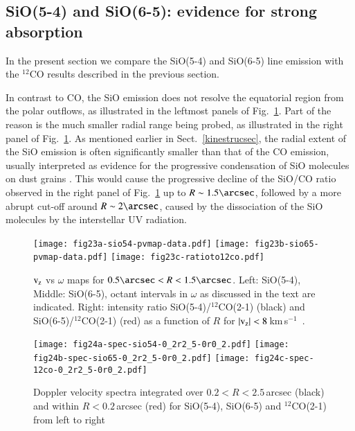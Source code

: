 \documentclass{aa}
\newcommand{\kms}{\,km\,s$^{-1}$~}
\begin{document}
\subsection{SiO(5-4) and SiO(6-5): evidence for strong absorption}
\label{siokinesec}

In the present section we compare the SiO(5-4) and SiO(6-5) line
emission with the $^{12}$CO results described in the previous section.
      
In contrast to CO, the SiO emission does not resolve the equatorial
region from the polar outflows, as illustrated in the leftmost panels
of Fig.~\ref{SiOwavefig}.  Part of the reason is the much smaller
radial range being probed, as illustrated in the right panel of
Fig.~\ref{SiOwavefig}. As mentioned earlier in
Sect.~\ref{kinestrucsec}, the radial extent of the SiO emission is
often significantly smaller than that of the CO emission, usually
interpreted as evidence for the progressive condensation of SiO
molecules on dust grains \citep[e.g.,][]{sowlk2004}. This would cause
the progressive decline of the SiO/CO ratio observed in the right
panel of Fig.~\ref{SiOwavefig}  up to $R\sim1.5\arcsec$, followed by a
more abrupt cut-off around $R\sim2\arcsec$, caused by the dissociation
of the SiO molecules by the interstellar UV radiation.
         
\begin{figure*}
  \centering
  \texttt{[image: fig23a-sio54-pvmap-data.pdf]}
  \texttt{[image: fig23b-sio65-pvmap-data.pdf]}
  \texttt{[image: fig23c-ratioto12co.pdf]}  
  \caption{${\rm v_z}$ vs $\omega$ maps for
    $0.5\arcsec<R<1.5\arcsec$. Left: SiO(5-4), Middle: SiO(6-5),
    octant intervals in $\omega$ as discussed in the text are indicated.
    Right: intensity ratio SiO(5-4)/$^{12}$CO(2-1) (black) and
    SiO(6-5)/$^{12}$CO(2-1) (red) as a function of $R$ for $|{\rm v_z}| <
    8$\kms.}
  \label{SiOwavefig}
\end{figure*}

\begin{figure*}
  \centering
  \texttt{[image: fig24a-spec-sio54-0\_2r2\_5-0r0\_2.pdf]}
  \texttt{[image: fig24b-spec-sio65-0\_2r2\_5-0r0\_2.pdf]}
  \texttt{[image: fig24c-spec-12co-0\_2r2\_5-0r0\_2.pdf]}
  \caption{Doppler velocity spectra integrated over $0.2<R<2.5$\,arcsec (black) and
    within $R<0.2$\,arcsec (red) for SiO(5-4), SiO(6-5) and $^{12}$CO(2-1) from
    left to right}
  \label{SiOCOspecfig}
\end{figure*}
\end{document}
